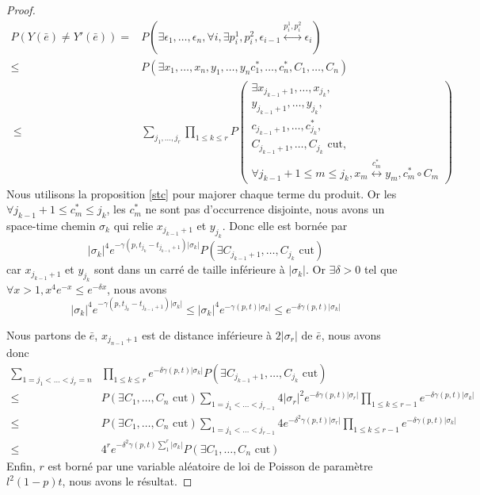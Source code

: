 \documentclass[titlepage,a4paper,12pt]{article}
\newcounter{prop}
\begin{document}
\begin{proof}
\begin{align*}
P(Y(\bar{e})\neq Y'(\bar{e})) =& P(\exists \epsilon_1,\dots,\epsilon_n, \forall i, \exists p_i^1,p_i^2, \epsilon_{i-1}\overset{p_i^1,p_i^2}{\longleftrightarrow}\epsilon_i) \\
 \leqslant &P(\exists x_1,\dots,x_n,y_1,\dots,y_n c^*_1,\dots,c^*_n,C_1,\dots,C_n) \\\
 \leqslant &\sum_{j_1,\dots,j_r}\prod_{1\leqslant k \leqslant r} P\left(\begin{array}{c}
 \exists x_{j_{k-1}+1},\dots,x_{j_k},\\
 y_{j_{k-1}+1},\dots,y_{j_k},\\
 c_{j_{k-1}+1},\dots,c^*_{j_k},\\
 C_{j_{k-1}+1},\dots,C_{j_k} \text{ cut},\\
 \forall j_{k-1}+1 \leqslant m \leqslant j_k, x_m\overset{c^*_m}{\longleftrightarrow} y_m, 
 c^*_m\circ C_m
 \end{array}
 \right)
\end{align*}
Nous utilisons la proposition \ref{stc} pour majorer chaque terme du produit. Or les $\forall j_{k-1}+1 \leqslant c^*_m \leqslant j_k$, les $c^*_m$ ne sont pas d'occurrence disjointe, nous avons un space-time chemin $\sigma_k$ qui relie $x_{j_{k-1}+1}$ et $y_{j_k}$. Donc elle est bornée par $$ \displaystyle |\sigma_k|^4 e^{-\gamma(p,t_{j_k}-t_{j_{k-1}+1})|\sigma_k|} P(\exists C_{j_{k-1}+1},\dots,C_{j_k} \text{ cut})$$ car $x_{j_{k-1}+1}$ et $y_{j_k}$ sont dans un carré de taille inférieure à $ |\sigma_k|$. Or $\exists \delta>0$ tel que $\forall x>1, x^4e^{-x} \leqslant e^{-\delta x}$, nous avons 
$$|\sigma_k|^4 e^{-\gamma(p,t_{j_k}-t_{j_{k-1}+1})|\sigma_k|} \leqslant |\sigma_k|^4 e^{-\gamma(p,t)|\sigma_k|} \leqslant e^{-\delta\gamma(p,t)|\sigma_k|}$$

Nous partons de $\bar{e}$, $x_{j_{n-1}+1}$ est de distance inférieure à $2|\sigma_r|$ de $\bar{e}$, nous avons donc 
\begin{align*}\sum_{1=j_1<\dots < j_r = n} &\prod_{1\leqslant k \leqslant r} e^{-\delta \gamma(p,t)|\sigma_k|} P(\exists C_{j_{k-1}+1},\dots,C_{j_k} \text{ cut}) \\
\leqslant & P(\exists C_1,\dots,C_n \text{ cut})\sum_{1=j_1<\dots < j_{r-1}} 4|\sigma_r|^2e^{-\delta \gamma(p,t)|\sigma_r|}\prod_{1\leqslant k \leqslant r-1}e^{-\delta \gamma(p,t)|\sigma_k|} \\
\leqslant & P(\exists C_1,\dots,C_n \text{ cut})\sum_{1=j_1<\dots < j_{r-1}} 4e^{-\delta^2 \gamma(p,t)|\sigma_r|}\prod_{1\leqslant k \leqslant r-1}e^{-\delta \gamma(p,t)|\sigma_k|} \\
\leqslant & 4^r e^{-\delta^2 \gamma(p,t)\sum_1^r|\sigma_k|}P(\exists C_1,\dots,C_n \text{ cut})
\end{align*}
Enfin, $r$ est borné par une variable aléatoire de loi de Poisson de paramètre $l^2 (1-p) t$, nous avons le résultat.
\end{proof}
\end{document}
